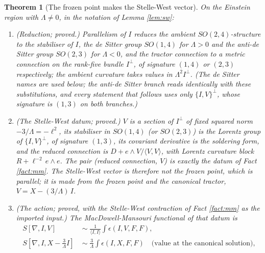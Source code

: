 \documentclass[11pt]{article}
\newtheorem{theorem}{Theorem}[section]
\theoremstyle{definition}
\newcommand{\ip}[2]{\langle #1, #2\rangle}
\begin{document}
\begin{theorem}[The frozen point makes the Stelle-West vector]\label{thm:action}
On the Einstein region with $\Lambda \neq 0$, in the notation of Lemma \ref{lem:sw}:
\begin{enumerate}
\item[(i)] \emph{(Reduction; proved.)} Parallelism of $I$ reduces the ambient $SO(2,4)$-structure to the stabiliser of $I$, the de Sitter group $SO(1,4)$ for $\Lambda > 0$ and the anti-de Sitter group $SO(2,3)$ for $\Lambda < 0$, and the tractor connection to a metric connection on the rank-five bundle $I^\perp$, of signature $(1,4)$ or $(2,3)$ respectively; the ambient curvature takes values in $\Lambda^2 I^\perp$. (The de Sitter names are used below; the anti-de Sitter branch reads identically with these substitutions, and every statement that follows uses only $\{I,V\}^\perp$, whose signature is $(1,3)$ on both branches.)
\item[(ii)] \emph{(The Stelle-West datum; proved.)} $V$ is a section of $I^\perp$ of fixed squared norm $-3/\Lambda = -\ell^2$, its stabiliser in $SO(1,4)$ (or $SO(2,3)$) is the Lorentz group of $\{I, V\}^\perp$, of signature $(1,3)$, its covariant derivative is the soldering form, and the reduced connection is $D + e\wedge V/\ip{V}{V}$, with Lorentz curvature block $R + \ell^{-2}\,e\wedge e$. The pair (reduced connection, $V$) is exactly the datum of Fact \ref{fact:mm}. The Stelle-West vector is therefore not the frozen point, which is parallel; it is made from the frozen point and the canonical tractor, $V = X - (3/\Lambda)\,I$.
\item[(iii)] \emph{(The action; proved, with the Stelle-West contraction of Fact \ref{fact:mm} as the imported input.)} The MacDowell-Mansouri functional of that datum is
\[
\begin{aligned}
S[\nabla, I, V] \;&\sim\; \frac{1}{\ip{I}{I}} \int \epsilon(I, V, F, F), \\
S[\nabla, I, X - \tfrac{3}{\Lambda}I] \;&\sim\; \frac{3}{\Lambda}\int \epsilon(I, X, F, F) \quad\text{(value at the canonical solution),}
\end{aligned}
\]

\end{enumerate}
\end{theorem}
\end{document}
